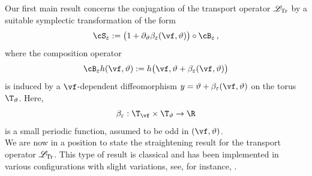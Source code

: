\documentclass[a4paper,reqno,10pt]{article}
\newcommand{\pa}{\partial}
\newcommand{\sL}{\mathscr{L}}
\begin{document}
Our first main result concerns the conjugation of the transport operator $\sL_{\rm Tr}$ by a suitable symplectic transformation of the form
\begin{equation}
	\cS_{\varepsilon} := \bigl(1+\pa_{\vartheta}\beta_{\varepsilon}(\vf,\vartheta)\bigr)\circ \cB_{\varepsilon} \,,
\end{equation}
where the composition operator
\begin{equation}
	\cB_{\varepsilon}h(\vf,\vartheta) := h\bigl(\vf,\vartheta + \beta_{\varepsilon}(\vf,\vartheta)\bigr)
\end{equation}
is induced by a $\vf$-dependent diffeomorphism $y= \vartheta + \beta_{\varepsilon}(\vf,\vartheta)$ on the torus $\T_{\vartheta}$. Here, $$\beta_{\varepsilon}:\T_{\vf}\times\T_{\vartheta}\to\R
$$ is a small periodic function, assumed to be odd in $(\vf,\vartheta)$.
\\
We are now in a position to state the straightening result for the transport operator $\sL_{\rm Tr}$. This type of result is classical and has been implemented in various configurations with slight variations, see, for instance, \cite{FMT25,HR21}.
\end{document}
